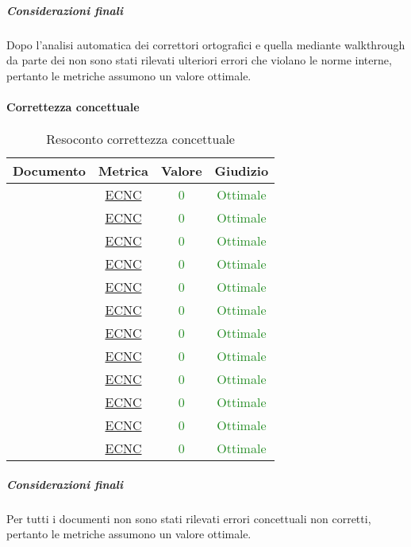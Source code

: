 					\subparagraph{Considerazioni finali}
					Dopo l'analisi automatica dei correttori ortografici e quella mediante walkthrough da parte dei \verificatori{} non sono stati rilevati ulteriori errori che violano le norme interne, pertanto le metriche assumono un valore ottimale.
					
				\paragraph{Correttezza concettuale}
				\begin{table}[H]
					\centering
					\small
					\begin{tabular}{c | c | c | c}
						\hline
						\textbf{Documento} & \textbf{Metrica} & \textbf{Valore} & \textbf{Giudizio} \\
						\hline
						\pdpvuno & \hyperref[MCC]{ECNC} & \textcolor{ForestGreen}{0} & \textcolor{ForestGreen}{Ottimale} \\
						\pdqvuno & \hyperref[MCC]{ECNC} & \textcolor{ForestGreen}{0} & \textcolor{ForestGreen}{Ottimale}\\
						\ndpvuno & \hyperref[MCC]{ECNC} &\textcolor{ForestGreen}{0} & \textcolor{ForestGreen}{Ottimale}\\
						\sdfv & \hyperref[MCC]{ECNC} & \textcolor{ForestGreen}{0} & \textcolor{ForestGreen}{Ottimale}\\
						\adrvuno & \hyperref[MCC]{ECNC} & \textcolor{ForestGreen}{0} & \textcolor{ForestGreen}{Ottimale}\\
						\glvuno  & \hyperref[MCC]{ECNC} & \textcolor{ForestGreen}{0} & \textcolor{ForestGreen}{Ottimale}\\
						\vunoi& \hyperref[MCC]{ECNC} & \textcolor{ForestGreen}{0} & \textcolor{ForestGreen}{Ottimale}\\
						\vduei& \hyperref[MCC]{ECNC} & \textcolor{ForestGreen}{0} & \textcolor{ForestGreen}{Ottimale}\\
						\vtrei & \hyperref[MCC]{ECNC} & \textcolor{ForestGreen}{0} & \textcolor{ForestGreen}{Ottimale}\\
						\vquattroi & \hyperref[MCC]{ECNC} & \textcolor{ForestGreen}{0} & \textcolor{ForestGreen}{Ottimale}\\
						\vunoe & \hyperref[MCC]{ECNC} & \textcolor{ForestGreen}{0} & \textcolor{ForestGreen}{Ottimale}\\
						\vduee & \hyperref[MCC]{ECNC} & \textcolor{ForestGreen}{0} & \textcolor{ForestGreen}{Ottimale}\\
						\hline
					\end{tabular}
					\caption{Resoconto correttezza concettuale}
					\label{tab_resoconto_correttezza_concettuale}
				\end{table}
				
				\subparagraph{Considerazioni finali}
					Per tutti i documenti non sono stati rilevati errori concettuali non corretti, pertanto le metriche assumono un valore ottimale.
					
				
				
					